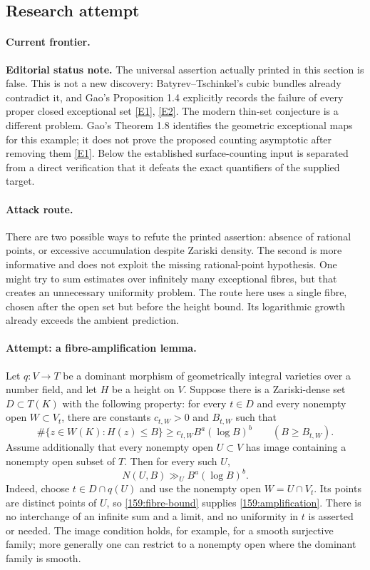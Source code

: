 \documentclass[11pt,a4paper]{article}
\newcommand{\eref}[2]{\hyperlink{extra:#1:#2}{[E#2]}}
\numberwithin{equation}{section}
\begin{document}
\subsection{Research attempt}

\paragraph{Current frontier.}
\textbf{Editorial status note.} The universal assertion actually printed in
this section is false. This is not a new discovery: Batyrev--Tschinkel's
cubic bundles already contradict it, and Gao's Proposition 1.4 explicitly
records the failure of every proper closed exceptional set
\eref{159}{1}, \eref{159}{2}. The modern thin-set conjecture is a different
problem. Gao's Theorem 1.8 identifies the geometric exceptional maps for
this example; it does not prove the proposed counting asymptotic after
removing them \eref{159}{1}. Below the established surface-counting input
is separated from a direct verification that it defeats the exact
quantifiers of the supplied target.

\paragraph{Attack route.}
There are two possible ways to refute the printed assertion: absence of
rational points, or excessive accumulation despite Zariski density. The
second is more informative and does not exploit the missing rational-point
hypothesis. One might try to sum estimates over infinitely many exceptional
fibres, but that creates an unnecessary uniformity problem. The route here
uses a single fibre, chosen after the open set but before the height bound.
Its logarithmic growth already exceeds the ambient prediction.

\paragraph{Attempt: a fibre-amplification lemma.}
Let $q:V\to T$ be a dominant morphism of geometrically integral varieties
over a number field, and let $H$ be a height on $V$. Suppose there is a
Zariski-dense set $D\subset T(K)$ with the following property: for every
$t\in D$ and every nonempty open $W\subset V_t$, there are constants
$c_{t,W}>0$ and $B_{t,W}$ such that
\begin{equation}\label{159:fibre-bound}
 \#\{z\in W(K):H(z)\le B\}\ge c_{t,W}B^a(\log B)^b
 \qquad(B\ge B_{t,W}).
\end{equation}
Assume additionally that every nonempty open $U\subset V$ has image
containing a nonempty open subset of $T$. Then for every such $U$,
\begin{equation}\label{159:amplification}
 N(U,B)\gg_U B^a(\log B)^b.
\end{equation}
Indeed, choose $t\in D\cap q(U)$ and use the nonempty open
$W=U\cap V_t$. Its points are distinct points of $U$, so
\eqref{159:fibre-bound} supplies \eqref{159:amplification}. There is no
interchange of an infinite sum and a limit, and no uniformity in $t$ is
asserted or needed. The image condition holds, for example, for a smooth
surjective family; more generally one can restrict to a nonempty open
where the dominant family is smooth.
\end{document}
